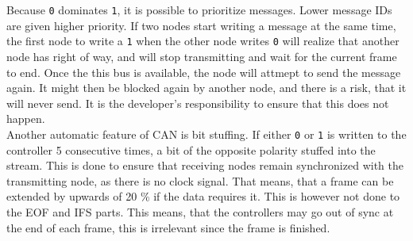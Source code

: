 Because \texttt{0} dominates \texttt{1}, it is possible to prioritize messages.
Lower message IDs are given higher priority.
If two nodes start writing a message at the same time, the first node to write a \texttt{1} when the other node writes \texttt{0} will realize that another node has right of way, and will stop transmitting and wait for the current frame to end.
Once the this bus is available, the node will attmept to send the message again.
It might then be blocked again by another node, and there is a risk, that it will never send.
It is the developer's responsibility to ensure that this does not happen.\\

Another automatic feature of CAN is bit stuffing.
If either \texttt{0} or \texttt{1} is written to the controller 5 consecutive times, a bit of the opposite polarity stuffed into the stream. 
This is done to ensure that receiving nodes remain synchronized with the transmitting node, as there is no clock signal.
That means, that a frame can be extended by upwards of 20 \% if the data requires it.
This is however not done to the EOF and IFS parts.
This means, that the controllers may go out of sync at the end of each frame, this is irrelevant since the frame is finished.
